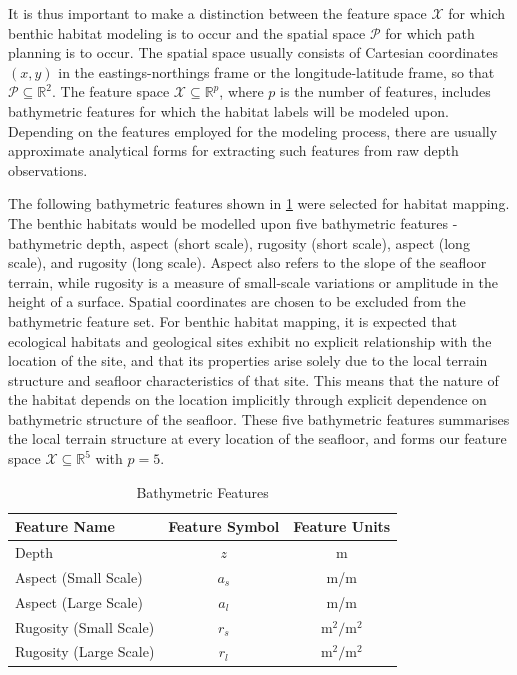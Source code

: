 		It is thus important to make a distinction between the feature space $\mathcal{X}$ for which benthic habitat modeling is to occur and the spatial space $\mathcal{P}$ for which path planning is to occur. The spatial space usually consists of Cartesian coordinates $(x, y)$ in the eastings-northings frame or the longitude-latitude frame, so that $\mathcal{P} \subseteq \mathbb{R}^{2}$. The feature space $\mathcal{X} \subseteq \mathbb{R}^{p}$, where $p$ is the number of features, includes bathymetric features for which the habitat labels will be modeled upon. Depending on the features employed for the modeling process, there are usually approximate analytical forms for extracting such features from raw depth observations.
		
		The following bathymetric features shown in \cref{Table:BathymetricFeatures} were selected for habitat mapping. The benthic habitats would be modelled upon five bathymetric features - bathymetric depth, aspect (short scale), rugosity (short scale), aspect (long scale), and rugosity (long scale). Aspect also refers to the slope of the seafloor terrain, while rugosity is a measure of small-scale variations or amplitude in the height of a surface. Spatial coordinates are chosen to be excluded from the bathymetric feature set. For benthic habitat mapping, it is expected that ecological habitats and geological sites exhibit no explicit relationship with the location of the site, and that its properties arise solely due to the local terrain structure and seafloor characteristics  of that site. This means that the nature of the habitat depends on the location implicitly through explicit dependence on bathymetric structure of the seafloor. These five bathymetric features summarises the local terrain structure at every location of the seafloor, and forms our feature space $\mathcal{X} \subseteq \mathbb{R}^{5}$ with $p = 5$. 
		
		\begin{table}[h]
			\begin{center}
				\begin{tabular}{ l c c }
					\hline
					\hline
					Feature Name & Feature Symbol & Feature Units \\
					\hline
					\hline
					Depth & $z$ & m \\
					Aspect (Small Scale) & $a_{s}$ & m/m \\
					Aspect (Large Scale) & $a_{l}$& m/m \\
					Rugosity (Small Scale) & $r_{s}$ & $\mathrm{m^{2}/m^{2}}$ \\
					Rugosity (Large Scale) & $r_{l}$ & $\mathrm{m^{2}/m^{2}}$  \\
					\hline
					\hline
				\end{tabular}
			\end{center}
	  	\caption{Bathymetric Features}
	  	\label{Table:BathymetricFeatures}			
	  	\end{table}	
		
